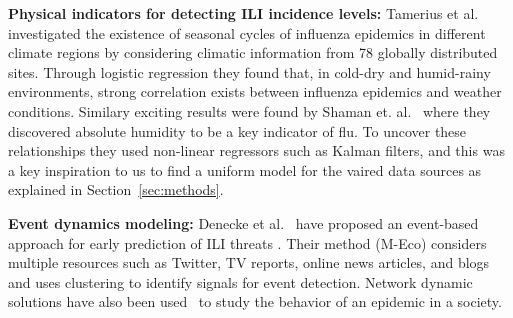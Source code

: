 \textbf{Physical indicators for detecting ILI incidence levels:} 
Tamerius et al.~\cite{ref9} investigated the existence of seasonal 
cycles of influenza epidemics in different climate regions
by considering climatic information from 78 globally distributed sites. Through 
logistic regression they found that, in cold-dry and humid-rainy
environments, strong correlation exists between influenza epidemics and
weather conditions. Similary exciting results were found 
by Shaman et. al.~\cite{Shaman_orig_humidity_link, Shaman_humidity_USA}
where they discovered absolute humidity to be a key indicator of flu. To uncover 
these relationships they used non-linear regressors such as Kalman filters,
and this was a key inspiration to us to find a uniform model for the
vaired data sources as explained in Section~\ref{sec:methods}.

%
\textbf{Event dynamics modeling:}
Denecke et al.~\cite{ref3}
have proposed an event-based approach for early prediction
of ILI threats \cite{ref3}. Their method (M-Eco) considers
multiple resources such as Twitter, TV reports, online news articles,
and blogs and uses clustering to identify signals for event detection.
Network dynamic solutions have also been used~\cite{ref11} 
to study the behavior of an epidemic in a society. 
 

